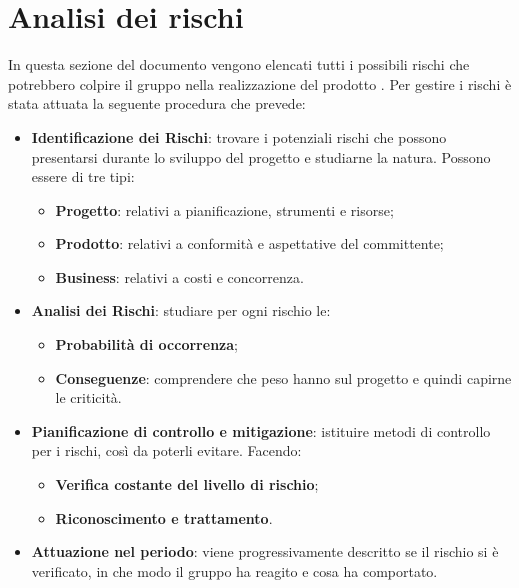 \newpage
\section{Analisi dei rischi}

	In questa sezione del documento vengono elencati tutti i possibili rischi che potrebbero colpire il gruppo \gruppo{} nella realizzazione del prodotto \progetto. Per gestire i rischi è stata attuata la seguente procedura che prevede: 
	
	\begin{itemize}
		
		\item \textbf{Identificazione dei Rischi}: trovare i potenziali rischi che possono presentarsi durante lo sviluppo del progetto e studiarne la natura. Possono essere di tre tipi:
			\begin{itemize}
				\item \textbf{Progetto}: relativi a pianificazione, strumenti e risorse;
				\item \textbf{Prodotto}: relativi a conformità e aspettative del committente;
				\item \textbf{Business}: relativi a costi e concorrenza.
			\end{itemize} 
				
		\item \textbf{Analisi dei Rischi}: studiare per ogni rischio le: 	
			\begin{itemize}
				\item \textbf{Probabilità di occorrenza};
				\item \textbf{Conseguenze}: comprendere che peso hanno sul progetto e quindi capirne le criticità.		
			\end{itemize}
		
		\item \textbf{Pianificazione di controllo e mitigazione}: istituire metodi di controllo per i rischi, così da poterli evitare. Facendo:
			\begin{itemize}
				\item \textbf{Verifica costante del livello di rischio};
				\item \textbf{Riconoscimento e trattamento}.
			\end{itemize}
			
		\item \textbf{Attuazione nel periodo}: viene progressivamente descritto se il rischio si è verificato, in che modo il gruppo ha reagito e cosa ha comportato. 
		
	\end{itemize}
	
